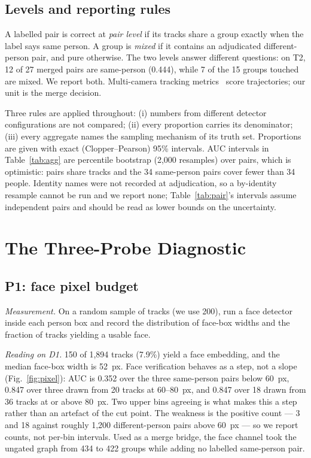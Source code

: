 \documentclass[journal]{IEEEtran}
\begin{document}
\subsection{Levels and reporting rules}
A labelled pair is correct at \emph{pair level} if its tracks share a group exactly when the label says same person. A group is \emph{mixed} if it contains an adjudicated different-person pair, and pure otherwise. The two levels answer different questions: on T2, 12 of 27 merged pairs are same-person (0.444), while 7 of the 15 groups touched are mixed. We report both. Multi-camera tracking metrics~\cite{luiten2021,ristani2016} score trajectories; our unit is the merge decision.

Three rules are applied throughout: (i) numbers from different detector configurations are not compared; (ii) every proportion carries its denominator; (iii) every aggregate names the sampling mechanism of its truth set. Proportions are given with exact (Clopper--Pearson) 95\% intervals. AUC intervals in Table~\ref{tab:agg} are percentile bootstrap (2,000 resamples) over pairs, which is optimistic: pairs share tracks and the 34 same-person pairs cover fewer than 34 people. Identity names were not recorded at adjudication, so a by-identity resample cannot be run and we report none; Table~\ref{tab:pair}'s intervals assume independent pairs and should be read as lower bounds on the uncertainty.

\section{The Three-Probe Diagnostic}\label{sec:probes}
\subsection{P1: face pixel budget}
\emph{Measurement.} On a random sample of tracks (we use 200), run a face detector inside each person box and record the distribution of face-box widths and the fraction of tracks yielding a usable face.

\emph{Reading on D1.} 150 of 1,894 tracks (7.9\%) yield a face embedding, and the median face-box width is 52~px. Face verification behaves as a step, not a slope (Fig.~\ref{fig:pixel}): AUC is 0.352 over the three same-person pairs below 60~px, 0.847 over three drawn from 20 tracks at 60--80~px, and 0.847 over 18 drawn from 36 tracks at or above 80~px. Two upper bins agreeing is what makes this a step rather than an artefact of the cut point. The weakness is the positive count --- 3 and 18 against roughly 1,200 different-person pairs above 60~px --- so we report counts, not per-bin intervals. Used as a merge bridge, the face channel took the ungated graph from 434 to 422 groups while adding no labelled same-person pair.
\end{document}

